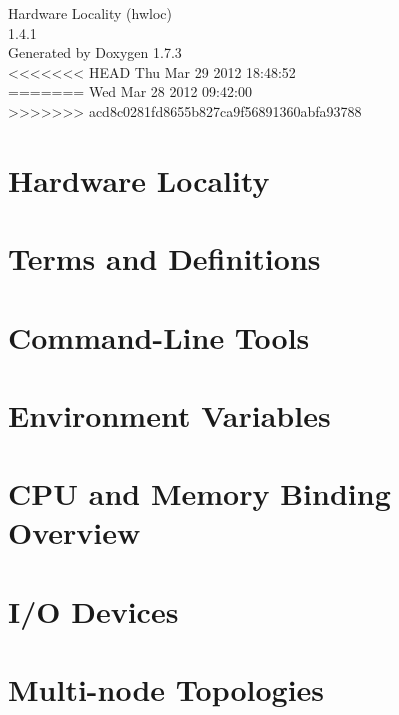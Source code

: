 \documentclass[a4paper]{book}
\begin{document}
\hypersetup{pageanchor=false}
\begin{titlepage}
\vspace*{7cm}
\begin{center}
{\Large Hardware Locality (hwloc) \\[1ex]\large 1.4.1 }\\
\vspace*{1cm}
{\large Generated by Doxygen 1.7.3}\\
\vspace*{0.5cm}
<<<<<<< HEAD
{\small Thu Mar 29 2012 18:48:52}\\
=======
{\small Wed Mar 28 2012 09:42:00}\\
>>>>>>> acd8c0281fd8655b827ca9f56891360abfa93788
\end{center}
\end{titlepage}
\clearemptydoublepage
{}
\tableofcontents
\clearemptydoublepage
{}
\hypersetup{pageanchor=true}
\chapter{Hardware Locality}
\label{index}\hypertarget{index}{}
\chapter{Terms and Definitions}
\label{termsanddefs}
\hypertarget{termsanddefs}{}

\chapter{Command-\/Line Tools}
\label{tools}
\hypertarget{tools}{}

\chapter{Environment Variables}
\label{envvar}
\hypertarget{envvar}{}

\chapter{CPU and Memory Binding Overview}
\label{cpu_mem_bind}
\hypertarget{cpu_mem_bind}{}

\chapter{I/O Devices}
\label{iodevices}
\hypertarget{iodevices}{}

\chapter{Multi-\/node Topologies}
\label{multinode}
\hypertarget{multinode}{}

\end{document}

